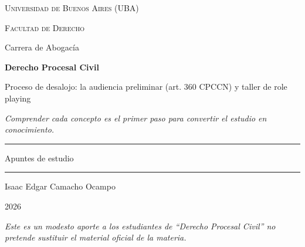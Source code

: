 \documentclass[12pt,oneside]{book}
\newcommand{\universidad}{Universidad de Buenos Aires (UBA)}
\newcommand{\facultad}{Facultad de Derecho}
\newcommand{\carrera}{Carrera de Abogacía}
\newcommand{\materia}{Derecho Procesal Civil}
\newcommand{\titulo}{Proceso de desalojo: la audiencia preliminar (art. 360 CPCCN) y taller de role playing}
\newcommand{\autor}{Isaac Edgar Camacho Ocampo}
\newcommand{\anio}{2026}
\begin{document}
\begin{titlepage}

\thispagestyle{empty}

\begin{center}

\vspace*{1cm}

{\large \textsc{\universidad}}

\vspace{0.2cm}

{\large \textsc{\facultad}}

\vspace{0.2cm}

{\large \carrera}

\vspace{3cm}

{\Huge \textbf{\materia}}

\vspace{1cm}

{\Large \titulo}

\vspace{0.8cm}

\textit{Comprender cada concepto es el primer paso para convertir el estudio en conocimiento.}

\vspace{1.2cm}

\rule{0.70\textwidth}{0.5pt}

\vspace{0.5cm}

{\large Apuntes de estudio}

\vspace{0.5cm}

\rule{0.70\textwidth}{0.5pt}

\vfill

{\large \autor}

\vspace{0.3cm}

{\large \anio}

\end{center}

\vfill

\begin{flushleft}
\textit{Este es un modesto aporte a los estudiantes de ``\materia'' no pretende sustituir el material oficial de la materia.}
\end{flushleft}

\end{titlepage}
\end{document}
